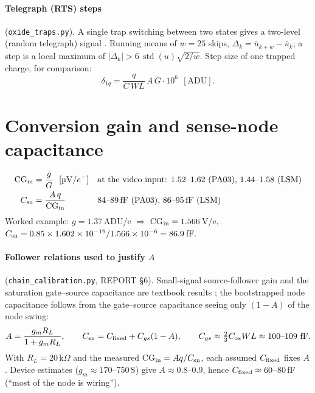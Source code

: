 \documentclass[10pt,a4paper]{article}
\newcommand{\code}[1]{\texttt{\small #1}}
\newcommand{\std}{\operatorname{std}}
\begin{document}
\paragraph{Telegraph (RTS) steps} (\code{oxide\_traps.py}). A single trap switching between two states gives a
two-level (random telegraph) signal \cite{kirton1989}. Running means of $w=25$ skips,
$\Delta_k=\bar u_{k+w}-\bar u_k$; a step is a local maximum of $|\Delta_k|>6\,\std(u)\sqrt{2/w}$. Step size of one
trapped charge, for comparison:
\begin{equation}
\delta_{1q}=\frac{q}{C\,WL}\,A\,G\cdot10^6\ \ [\text{ADU}].
\end{equation}

\section{Conversion gain and sense-node capacitance}

\begin{align}
\text{CG}_{\rm in}&=\frac{g}{G}\ \ [\text{\textmu V}/e^-] &&\text{at the video input: 1.52--1.62 (PA03), 1.44--1.58 (LSM)}\\
C_{\rm sn}&=\frac{A\,q}{\text{CG}_{\rm in}} &&\text{84--89\,fF (PA03), 86--95\,fF (LSM)}
\end{align}
Worked example: $g=1.37$\,ADU/e $\Rightarrow$ CG$_{\rm in}=1.566$\,\textmu V/e,
$C_{\rm sn}=0.85\times1.602\times10^{-19}/1.566\times10^{-6}=86.9$\,fF.

\paragraph{Follower relations used to justify $A$} (\code{chain\_calibration.py}, REPORT \S6). Small-signal
source-follower gain and the saturation gate--source capacitance are textbook results \cite{gray2009}; the bootstrapped
node capacitance follows from the gate--source capacitance seeing only $(1-A)$ of the node swing:
\begin{equation}
A=\frac{g_mR_L}{1+g_mR_L},\qquad C_{\rm sn}=C_{\rm fixed}+C_{gs}(1-A),\qquad C_{gs}\approx\tfrac23C_{\rm ox}WL\approx100\text{--}109\ \text{fF}.
\end{equation}
With $R_L=20$\,k$\Omega$ and the measured CG$_{\rm in}=Aq/C_{\rm sn}$, each assumed $C_{\rm fixed}$ fixes $A$. Device
estimates ($g_m\approx170$--750\,\textmu S) give $A\approx0.8$--0.9, hence $C_{\rm fixed}\approx60$--80\,fF (``most of
the node is wiring'').
\end{document}
